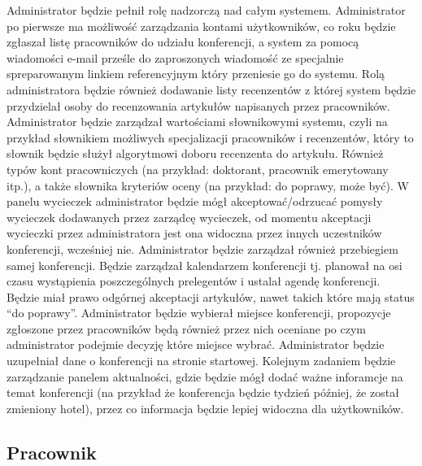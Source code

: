 Administrator będzie pełnił rolę nadzorczą nad całym systemem. Administrator po pierwsze ma możliwość zarządzania kontami użytkowników, co roku będzie zgłaszał listę pracowników do udziału konferencji, a system za pomocą wiadomości e-mail prześle do zaproszonych wiadomość ze specjalnie spreparowanym linkiem referencyjnym który przeniesie go do systemu. Rolą administratora będzie również dodawanie listy recenzentów z której system będzie przydzielał osoby do recenzowania artykułów napisanych przez pracowników.\newline
Administrator będzie zarządzał wartościami słownikowymi systemu, czyli na przykład słownikiem możliwych specjalizacji pracowników i recenzentów, który to słownik będzie służył algorytmowi doboru recenzenta do artykułu. Również typów kont pracowniczych (na przykład: doktorant, pracownik emerytowany itp.), a także słownika kryteriów oceny (na przykład: do poprawy, może być). \newline
W panelu wycieczek administrator będzie mógł akceptować/odrzucać pomysły wycieczek dodawanych przez zarządcę wycieczek, od momentu akceptacji wycieczki przez administratora jest ona widoczna przez innych uczestników konferencji, wcześniej nie. \newline
Administrator będzie zarządzał również przebiegiem samej konferencji. Będzie zarządzał kalendarzem konferencji tj. planował na osi czasu wystąpienia poszczególnych prelegentów i ustalał agendę konferencji. Będzie miał prawo odgórnej akceptacji artykułów, nawet takich które mają status ``do poprawy''. \newline
Administrator będzie wybierał miejsce konferencji, propozycje zgłoszone przez pracowników będą również przez nich oceniane po czym administrator podejmie decyzję które miejsce wybrać. Administrator będzie uzupełniał dane o konferencji na stronie startowej. \newline
Kolejnym zadaniem będzie zarządzanie panelem aktualności, gdzie będzie mógł dodać ważne inforamcje na temat konferencji (na przykład że konferencja będzie tydzień później, że został zmieniony hotel), przez co informacja będzie lepiej widoczna dla użytkowników.

\subsection{Pracownik}

